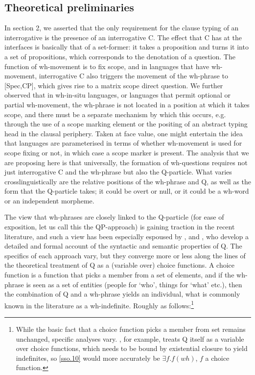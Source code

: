 \documentclass[11pt]{article}
\begin{document}
\subsection{Theoretical preliminaries}
In section 2, we asserted that the only requirement for the clause typing of an interrogative is the presence of an interrogative C. The effect that C has at the interfaces is basically that of a set-former: it takes a proposition and turns it into a set of propositions, which corresponds to the denotation of a question. The function of wh-movement is to fix scope, and in languages that have wh-movement, interrogative C also triggers the movement of the wh-phrase to [Spec,CP], which gives rise to a matrix scope direct question. We further observed that in wh-in-situ languages, or languages that permit optional or partial wh-movement, the wh-phrase is not located in a position at which it takes scope, and there must be a separate mechanism by which this occurs, e.g. through the use of a scope marking element or the positing of an abstract typing head in the clausal periphery. Taken at face value, one might entertain the idea that languages are parameterised in terms of whether wh-movement is used for scope fixing or not, in which case a scope marker is present. The analysis that we are proposing here is that universally, the formation of wh-questions requires not just interrogative C and the wh-phrase but also the Q-particle. What varies crosslinguistically are the relative positions of the wh-phrase and Q, as well as the form that the Q-particle takes; it could be overt or null, or it could be a wh-word or an independent morpheme.

The view that wh-phrases are closely linked to the Q-particle (for ease of exposition, let us call this the QP-approach) is gaining traction in the recent literature, and such a view has been especially espoused by \cite{hagstrom:1998}, \cite{cable:2007} and \cite{slade:2011}, who develop a detailed and formal account of the syntactic and semantic properties of Q. The specifics of each approach vary, but they converge more or less along the lines of the theoretical treatment of Q as a (variable over) choice functions. A choice function is a function that picks a member from a set of elements, and if the wh-phrase is seen as a set of entities (people for `who', things for `what' etc.), then the combination of Q and a wh-phrase yields an individual, what is commonly known in the literature as a wh-indefinite. Roughly as follows:\footnote{While the basic fact that a choice function picks a member from set remains unchanged, specific analyses vary. \cite{cable:2007}, for example, treats Q itself as a variable over choice functions, which needs to be bound by existential closure to yield indefinites, so \ref{sso.10} would more accurately be $\exists f.f(wh)$, $f$ a choice function.}
\end{document}
